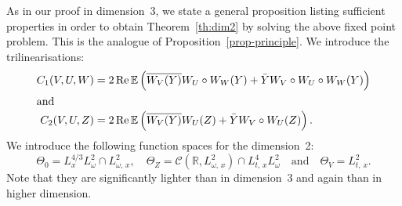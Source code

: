 \documentclass[AHL, Unicode, longabstracts,published]{cedram}
\newcommand{\R}{\mathbb{R}}
\newcommand{\E}{\mathbb{E}}
\DeclareMathOperator{\re}{Re}
\newcommand{\mclC}{\mathcal{C}}
\begin{document}
As in our proof in dimension~$3$, we state a general proposition listing sufficient properties in order to obtain Theorem~\ref{th:dim2} by solving the above fixed point problem. This is the analogue of Proposition~\ref{prop-principle}. We introduce the trilinearisations:
\begin{align*}
C_1(V,U,W) &= 2 \re \E\left(\overline{W_V(Y)} W_U \circ W_W(Y) + \bar Y W_V \circ W_U \circ W_W(Y)\right)
\\
\intertext{and}
C_2(V,U,Z) &= 2\re \E\left(\overline{W_V(Y)} W_U(Z) + \bar Y W_V\circ W_U(Z)\right).
\end{align*}
We introduce the following function spaces for the dimension~2:
\begin{equation} \label{def:spacesd2}
\Theta_0 = L^{4/3}_x L^2_\omega \cap L^2_{\omega,\,x}, \quad \Theta_Z = \mclC\left(\R, L^2_{\omega,\,x}\right) \cap L^4_{t,\,x} L^2_\omega \quad \text{and}\quad \Theta_V = L^2_{t,\,x}.
\end{equation}
Note that they are significantly lighter than in dimension~3 and again than in higher dimension.
\vspace{8pt}
\pagebreak
\end{document}
